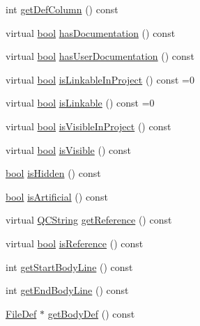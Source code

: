 \begin{DoxyCompactItemize}
\item 
int \hyperlink{class_definition_abc16ee564cb0be049ec0f17e2adf0bca}{get\+Def\+Column} () const 
\item 
virtual \hyperlink{qglobal_8h_a1062901a7428fdd9c7f180f5e01ea056}{bool} \hyperlink{class_definition_a2332d001413c64148e41a6f89b80f015}{has\+Documentation} () const 
\item 
virtual \hyperlink{qglobal_8h_a1062901a7428fdd9c7f180f5e01ea056}{bool} \hyperlink{class_definition_a92f28d12009f388a30c5e564e5ea3493}{has\+User\+Documentation} () const 
\item 
virtual \hyperlink{qglobal_8h_a1062901a7428fdd9c7f180f5e01ea056}{bool} \hyperlink{class_definition_a42d63ce257989107587783ab9d491bba}{is\+Linkable\+In\+Project} () const  =0
\item 
virtual \hyperlink{qglobal_8h_a1062901a7428fdd9c7f180f5e01ea056}{bool} \hyperlink{class_definition_a649060d1a5a3767bc6698e5fb5f8321b}{is\+Linkable} () const  =0
\item 
virtual \hyperlink{qglobal_8h_a1062901a7428fdd9c7f180f5e01ea056}{bool} \hyperlink{class_definition_a451f82aa30e6eff67c0d9a0e919a105d}{is\+Visible\+In\+Project} () const 
\item 
virtual \hyperlink{qglobal_8h_a1062901a7428fdd9c7f180f5e01ea056}{bool} \hyperlink{class_definition_a9e3fcb5ffe5c7db9d32c1a5a53bcf091}{is\+Visible} () const 
\item 
\hyperlink{qglobal_8h_a1062901a7428fdd9c7f180f5e01ea056}{bool} \hyperlink{class_definition_ab322705fb59551eb0e8aa3b08c4dfbee}{is\+Hidden} () const 
\item 
\hyperlink{qglobal_8h_a1062901a7428fdd9c7f180f5e01ea056}{bool} \hyperlink{class_definition_acaf5924f905bf4d71c9adf4c78786eab}{is\+Artificial} () const 
\item 
virtual \hyperlink{class_q_c_string}{Q\+C\+String} \hyperlink{class_definition_a266bc8f350de23e01335d4d674995dcf}{get\+Reference} () const 
\item 
virtual \hyperlink{qglobal_8h_a1062901a7428fdd9c7f180f5e01ea056}{bool} \hyperlink{class_definition_aeac1898371c546441cf689c1f66e359b}{is\+Reference} () const 
\item 
int \hyperlink{class_definition_ac1b628c3fd8382f3c8f365c5af01bc87}{get\+Start\+Body\+Line} () const 
\item 
int \hyperlink{class_definition_a11056f29c65e1dddc184036bce5d5456}{get\+End\+Body\+Line} () const 
\item 
\hyperlink{class_file_def}{File\+Def} $\ast$ \hyperlink{class_definition_a71a78aea744611bdf33467e285f21878}{get\+Body\+Def} () const 

\end{DoxyCompactItemize}
